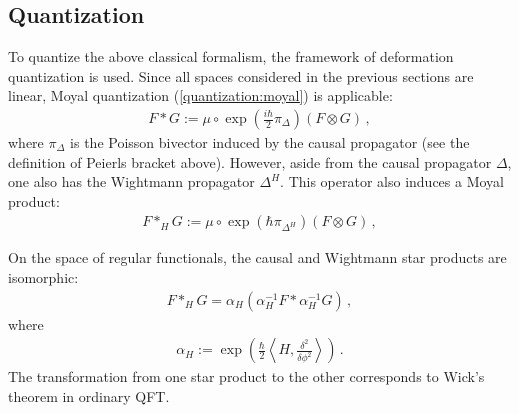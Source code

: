 \subsection{Quantization}

    To quantize the above classical formalism, the framework of deformation quantization is used. Since all spaces considered in the previous sections are linear, Moyal quantization (\cref{quantization:moyal}) is applicable:
    \begin{gather}
        F\ast G := \mu\circ\exp(\tfrac{i\hbar}{2}\pi_\Delta)(F\otimes G)\,,
    \end{gather}
    where $\pi_\Delta$ is the Poisson bivector induced by the causal propagator (see the definition of Peierls bracket above). However, aside from the causal propagator $\Delta$, one also has the Wightmann propagator $\Delta^H$. This operator also induces a Moyal product:
    \begin{gather}
        \label{aqft:moyal_product}
        F\ast_HG := \mu\circ\exp(\hbar\pi_{\Delta^H})(F\otimes G)\,,
    \end{gather}

    \begin{property}
        On the space of regular functionals, the causal and Wightmann star products are isomorphic:
        \begin{gather}
            F\ast_HG = \alpha_H(\alpha_H^{-1}F\ast\alpha_H^{-1}G)\,,
        \end{gather}
        where
        \begin{gather}
            \alpha_H := \exp\left(\frac{\hbar}{2}\left\langle H,\frac{\delta^2}{\delta\phi^2}\right\rangle\right)\,.
        \end{gather}
        The transformation from one star product to the other corresponds to Wick's theorem in ordinary QFT.
    \end{property}

